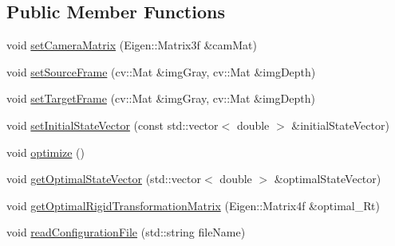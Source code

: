 \subsection*{Public Member Functions}
\begin{DoxyCompactItemize}
\item 
void \hyperlink{class_photoconsistency_odometry_1_1_ceres_1_1_c_photoconsistency_odometry_ceres_ad45891d5065f3b00c40c8dbca794a632}{setCameraMatrix} (Eigen::Matrix3f \&camMat)
\item 
void \hyperlink{class_photoconsistency_odometry_1_1_ceres_1_1_c_photoconsistency_odometry_ceres_a987feeea7aab8dcc09ef82bde0814ed7}{setSourceFrame} (cv::Mat \&imgGray, cv::Mat \&imgDepth)
\item 
void \hyperlink{class_photoconsistency_odometry_1_1_ceres_1_1_c_photoconsistency_odometry_ceres_afb707483f6766c5069eaad9824382272}{setTargetFrame} (cv::Mat \&imgGray, cv::Mat \&imgDepth)
\item 
void \hyperlink{class_photoconsistency_odometry_1_1_ceres_1_1_c_photoconsistency_odometry_ceres_a0993e83c820d16e606bce87edabbcd12}{setInitialStateVector} (const std::vector$<$ double $>$ \&initialStateVector)
\item 
void \hyperlink{class_photoconsistency_odometry_1_1_ceres_1_1_c_photoconsistency_odometry_ceres_af177ce6dd5517d73d5cf25da266a2777}{optimize} ()
\item 
void \hyperlink{class_photoconsistency_odometry_1_1_ceres_1_1_c_photoconsistency_odometry_ceres_a54f00adc07a9027430b4044284dec16c}{getOptimalStateVector} (std::vector$<$ double $>$ \&optimalStateVector)
\item 
void \hyperlink{class_photoconsistency_odometry_1_1_ceres_1_1_c_photoconsistency_odometry_ceres_aef03c06654345aeea7c0e128b575420d}{getOptimalRigidTransformationMatrix} (Eigen::Matrix4f \&optimal\_\-Rt)
\item 
void \hyperlink{class_photoconsistency_odometry_1_1_ceres_1_1_c_photoconsistency_odometry_ceres_a459e59ddd284a1a1a5c239f55dd7fc12}{readConfigurationFile} (std::string fileName)
\end{DoxyCompactItemize}
